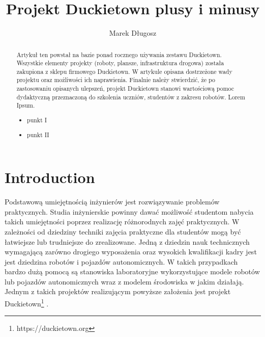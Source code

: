 \documentclass{svproc}
\begin{document}
\mainmatter              %
%
\title{Projekt Duckietown plusy i minusy}
%
%
\author{Marek Długosz}
%
%
%

\maketitle              %

\begin{abstract}
Artykuł ten powstał na bazie ponad rocznego używania zestawu Duckietown. Wszystkie elementy projekty (roboty, plansze, infrastruktura drogowa) została zakupiona z sklepu firmowego Duckietown.
W artykule opisana dostrzeżone wady projektu oraz możliwości ich naprawienia.
Finalnie należy stwierdzić, że po zastosowaniu opisanych ulepszeń, projekt Duckietown stanowi wartościową pomoc dydaktyczną przeznaczoną do szkolenia uczniów, studentów z zakresu robotów.
Lorem Ipsum.
\begin{itemize}
    \item punkt I
    \item punkt II
\end{itemize}
\end{abstract}
%
\section{Introduction}
Podstawową umiejętnością inżynierów jest rozwiązywanie problemów praktycznych. Studia inżynierskie powinny dawać możliwość studentom nabycia takich umiejętności poprzez realizację różnorodnych zajęć praktycznych. W zależności od dziedziny techniki zajęcia praktyczne dla studentów mogą być łatwiejsze lub trudniejsze do zrealizowane. Jedną z dziedzin nauk technicznych wymagającą zarówno drogiego wyposażenia oraz wysokich kwalifikacji kadry jest jest dziedzina robotów i pojazdów autonomicznych. 
W takich przypadkach bardzo dużą pomocą są stanowiska laboratoryjne wykorzystujące modele robotów lub pojazdów autonomicznych wraz z modelem środowiska w jakim działają.
Jednym z takich projektów realizującym powyższe założenia jest projekt Duckietown\footnote{https://duckietown.org} \cite{tani2017duckietown}.
\end{document}
